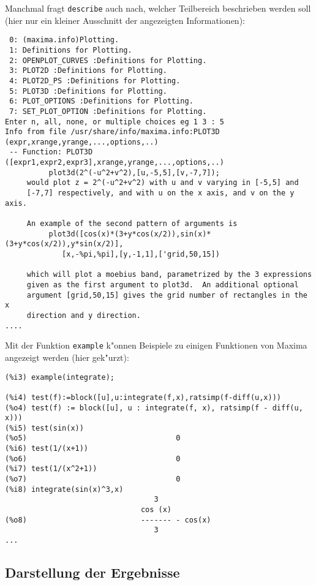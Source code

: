 \documentclass[ngerman,12pt,a4paper]{article}
\begin{document}
Manchmal fragt \verb|describe| auch nach, welcher Teilbereich beschrieben werden soll (hier nur ein kleiner Ausschnitt der angezeigten Informationen):
\scriptsize
\begin{verbatim}
 0: (maxima.info)Plotting.
 1: Definitions for Plotting.
 2: OPENPLOT_CURVES :Definitions for Plotting.
 3: PLOT2D :Definitions for Plotting.
 4: PLOT2D_PS :Definitions for Plotting.
 5: PLOT3D :Definitions for Plotting.
 6: PLOT_OPTIONS :Definitions for Plotting.
 7: SET_PLOT_OPTION :Definitions for Plotting.
Enter n, all, none, or multiple choices eg 1 3 : 5
Info from file /usr/share/info/maxima.info:PLOT3D (expr,xrange,yrange,...,options,..)
 -- Function: PLOT3D ([expr1,expr2,expr3],xrange,yrange,...,options,..)
          plot3d(2^(-u^2+v^2),[u,-5,5],[v,-7,7]);
     would plot z = 2^(-u^2+v^2) with u and v varying in [-5,5] and
     [-7,7] respectively, and with u on the x axis, and v on the y axis.

     An example of the second pattern of arguments is
          plot3d([cos(x)*(3+y*cos(x/2)),sin(x)*(3+y*cos(x/2)),y*sin(x/2)],
             [x,-%pi,%pi],[y,-1,1],['grid,50,15])

     which will plot a moebius band, parametrized by the 3 expressions
     given as the first argument to plot3d.  An additional optional
     argument [grid,50,15] gives the grid number of rectangles in the x
     direction and y direction.
....
\end{verbatim}
\normalsize

Mit der Funktion \verb|example| k"onnen Beispiele zu einigen Funktionen von Maxima angezeigt werden (hier gek"urzt):
\scriptsize
\begin{verbatim}
(%i3) example(integrate);

(%i4) test(f):=block([u],u:integrate(f,x),ratsimp(f-diff(u,x)))
(%o4) test(f) := block([u], u : integrate(f, x), ratsimp(f - diff(u, x)))
(%i5) test(sin(x))
(%o5)                                  0
(%i6) test(1/(x+1))
(%o6)                                  0
(%i7) test(1/(x^2+1))
(%o7)                                  0
(%i8) integrate(sin(x)^3,x)
                                  3
                               cos (x)
(%o8)                          ------- - cos(x)
                                  3
...
\end{verbatim}
\normalsize

\subsection{Darstellung der Ergebnisse}
\end{document}
